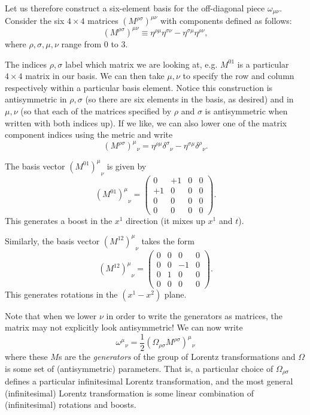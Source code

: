 Let us therefore construct a six-element basis for the off-diagonal piece $\omega_{\mu\nu}$. Consider the six $4\times 4$ matrices $(M^{\rho\sigma})^{\mu\nu}$ with components defined as follows:
\begin{equation}
    (M^{\rho\sigma})^{\mu\nu} \equiv \eta^{\rho\mu}\eta^{\sigma\nu} - \eta^{\sigma\mu}\eta^{\rho\nu},
\end{equation}
where $\rho,\sigma,\mu,\nu$ range from $0$ to $3$.

The indices $\rho,\sigma$ label which matrix we are looking at, e.g. $M^{01}$ is a particular $4\times 4$ matrix in our basis. We can then take $\mu,\nu$ to specify the row and column respectively within a particular basis element.
Notice this construction is antisymmetric in $\rho,\sigma$ (so there are six elements in the basis, as desired) and in $\mu,\nu$ (so that each of the matrices specified by $\rho$ and $\sigma$ is antisymmetric when written with both indices up). 
If we like, we can also lower one of the matrix component indices using the metric and write
\begin{equation}
    (M^{\rho\sigma})^\mu{}_\nu=\eta^{\rho\mu}\delta^\sigma{}_\nu-\eta^{\sigma\mu}\delta^\rho{}_\nu.
\end{equation}
\begin{exm}
The basis vector ${(M^{01})^\mu}_\nu$ is given by
$${(M^{01})^\mu}_\nu=
\begin{pmatrix}
0&+1&0&0\\
+1&0&0&0\\
0&0&0&0\\
0&0&0&0
\end{pmatrix}.$$
This generates a boost in the $x^1$ direction (it mixes up $x^1$ and $t$).

Similarly, the basis vector ${(M^{12})^\mu}_\nu$ takes the form
$${(M^{12})^\mu}_\nu=
\begin{pmatrix}
0&0&0&0\\
0&0&-1&0\\
0&1&0&0\\
0&0&0&0
\end{pmatrix}.$$
This generates rotations in the $(x^1-x^2)$ plane.
\end{exm}
Note that when we lower $\nu$ in order to write the generators as matrices, the matrix may not explicitly look antisymmetric! We can now write
\begin{equation}
    \omega^\mu{}_\nu=\frac{1}{2}(\Omega_{\rho\sigma}M^{\rho\sigma})^\mu{}_\nu
\end{equation}
where these $M$s are the \emph{generators} of the group of Lorentz transformations and $\Omega$ is some set of (antisymmetric) parameters. That is, a particular choice of $\Omega_{\rho\sigma}$ defines a particular infinitesimal Lorentz transformation, and the most general (infinitesimal) Lorentz transformation is some linear combination of (infinitesimal) rotations and boosts.
